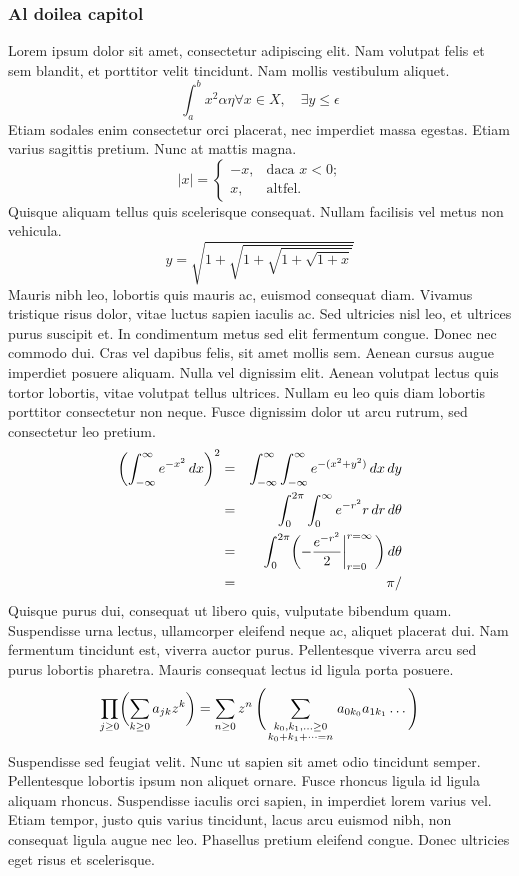 \begin{frame}
\frametitle{Al doilea capitol} 
Lorem ipsum dolor sit amet, consectetur adipiscing elit. Nam volutpat felis et sem blandit, et porttitor velit tincidunt. Nam mollis vestibulum aliquet. 
\begin{equation}
\int_a^b x^2 \alpha \eta \forall x \in X, \quad \exists y \leq \epsilon
\end{equation}
Etiam sodales enim consectetur orci placerat, nec imperdiet massa egestas. Etiam varius sagittis pretium. Nunc at mattis magna.
$$|x| = \left\{\begin{array}{rl} -x, & \textrm{daca $x<0$;}\\ x, & \textrm{altfel.} \end{array} \right. $$
Quisque aliquam tellus quis scelerisque consequat. Nullam facilisis vel metus non vehicula.
$$y = \sqrt{1+\sqrt{1+\sqrt{1+ \sqrt{1+x}}}}$$
Mauris nibh leo, lobortis quis mauris ac, euismod consequat diam. Vivamus tristique risus dolor, vitae luctus sapien iaculis ac. Sed ultricies nisl leo, et ultrices purus suscipit et. In condimentum metus sed elit fermentum congue. Donec nec commodo dui. Cras vel dapibus felis, sit amet mollis sem. Aenean cursus augue imperdiet posuere aliquam. 
Nulla vel dignissim elit. Aenean volutpat lectus quis tortor lobortis, vitae volutpat tellus ultrices. Nullam eu leo quis diam lobortis porttitor consectetur non neque. Fusce dignissim dolor ut arcu rutrum, sed consectetur leo pretium.
\begin{eqnarray}
\biggl(\int_{-\infty} ^\infty e^{-x^2}\,dx\biggr)^2 & =& \int_{-\infty}^\infty \int_{-\infty}^\infty e^{-(x^2+y^2)}\,dx\,dy \nonumber \\ & =& \int_0^{2\pi}\int_0^\infty e^{-r^2}r\,dr\,d\theta \nonumber \\ & =& \int_0^{2\pi}\biggl(-{e^{-r^2}\over2} \bigg|_{r=0}^{r=\infty}\,\biggr)\,d\theta \nonumber \\ & =& \pi /\end{eqnarray}
 Quisque purus dui, consequat ut libero quis, vulputate bibendum quam. Suspendisse urna lectus, ullamcorper eleifend neque ac, aliquet placerat dui. Nam fermentum tincidunt est, viverra auctor purus. Pellentesque viverra arcu sed purus lobortis pharetra. Mauris consequat lectus id ligula porta posuere.
$$ \prod_{j\ge0}\biggl( \sum_{k\ge0}a_{jk}z^k\biggr) =\sum_{n\ge0}z^n\,\Biggl(\sum_ {\scriptstyle k_0,k_1, \ldots\ge0\atop \scriptstyle k_0+k_1+\cdots=n} a_{0k_0}a_{1k_1}\ldots\,\Biggr) $$
Suspendisse sed feugiat velit. Nunc ut sapien sit amet odio tincidunt semper. Pellentesque lobortis ipsum non aliquet ornare. Fusce rhoncus ligula id ligula aliquam rhoncus. Suspendisse iaculis orci sapien, in imperdiet lorem varius vel. Etiam tempor, justo quis varius tincidunt, lacus arcu euismod nibh, non consequat ligula augue nec leo. Phasellus pretium eleifend congue. Donec ultricies eget risus et scelerisque.

\end{frame}
